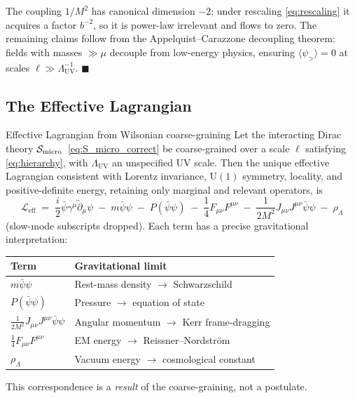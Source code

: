 \documentclass[11pt,a4paper]{article}
\theoremstyle{definition}
\theoremstyle{remark}
\begin{document}
		The coupling $1/M^2$ has canonical dimension $-2$; under rescaling
		\eqref{eq:rescaling} it acquires a factor $b^{-2}$, so it is power-law
		irrelevant and flows to zero.  The remaining claims follow from the
		Appelquist--Carazzone decoupling theorem: fields with masses
		$\gg \mu$ decouple from low-energy physics, ensuring
		$\langle\psi_{>}\rangle = 0$ at scales $\ell \gg \Lambda_{\mathrm{UV}}^{-1}$.
		\hfill$\blacksquare$
	
	\subsection{The Effective Lagrangian}
	
	Effective Lagrangian from Wilsonian coarse-graining
		\label{thm:Leff}
		Let the interacting Dirac theory $\mathcal{S}_{\rm micro}$~\eqref{eq:S_micro_correct} be coarse-grained over a scale
		$\ell$ satisfying \eqref{eq:hierarchy}, with $\Lambda_{\mathrm{UV}}$ an
		unspecified UV scale.  Then the unique effective Lagrangian consistent with
		Lorentz invariance, $\mathrm{U}(1)$ symmetry, locality, and positive-definite
		energy, retaining only marginal and relevant operators, is
		\begin{equation}
			\boxed{
				\mathcal{L}_{\mathrm{eff}}
				\;=\;\frac{i}{2}\bar{\psi}\gamma^\mu\overleftrightarrow{\partial}_\mu\psi
				\;-\; m\bar{\psi}\psi
				\;-\; P(\bar{\psi}\psi)
				\;-\; \frac{1}{4}F_{\mu\nu}F^{\mu\nu}
				\;-\; \frac{1}{2M^2}J_{\mu\nu}J^{\mu\nu}\bar{\psi}\psi
				\;-\; \rho_\Lambda
			}
			\label{eq:Leff_final}
		\end{equation}
		(slow-mode subscripts dropped).  Each term has a precise gravitational
		interpretation:
		\begin{center}
			\begin{tabular}{ll}
				\hline
				\textbf{Term} & \textbf{Gravitational limit} \\
				\hline
				$m\bar{\psi}\psi$
				& Rest-mass density $\to$ Schwarzschild \\
				$P(\bar{\psi}\psi)$
				& Pressure $\to$ equation of state \\
				$\tfrac{1}{2M^2}J_{\mu\nu}J^{\mu\nu}\bar{\psi}\psi$
				& Angular momentum $\to$ Kerr frame-dragging \\
				$\tfrac{1}{4}F_{\mu\nu}F^{\mu\nu}$
				& EM energy $\to$ Reissner--Nordstr\"om \\
				$\rho_\Lambda$
				& Vacuum energy $\to$ cosmological constant \\
				\hline
			\end{tabular}
		\end{center}
		This correspondence is a \emph{result} of the coarse-graining, not a postulate.
	
\end{document}

